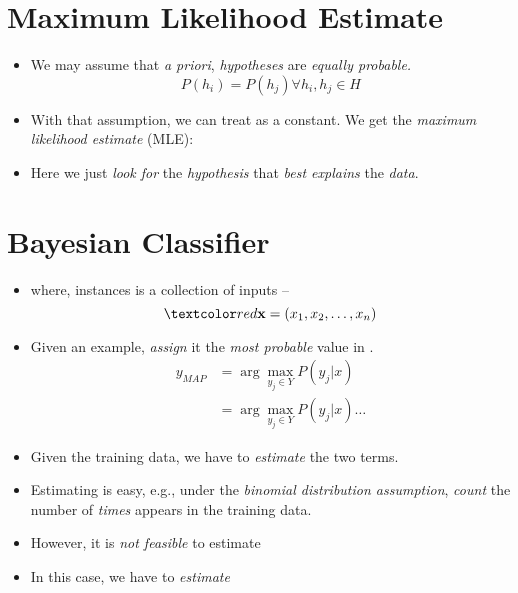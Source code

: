 \documentclass[
	number={3},
	title={Na\"{\i}ive Bayes Learning}
]{cs584notes}
\begin{document}
\section{Maximum Likelihood Estimate}\label{sec:maximum-likelihood-estimate}
\begin{itemize}
	\item We may assume that \emph{a priori}, \emph{hypotheses} are \emph{equally probable.}
	\[ P(h_{i}) = P(h_{j}) \forall h_{i}, h_{j} \in H \]
	\item With that assumption, we can treat  as a constant. We get the \emph{maximum likelihood estimate} (MLE):
	\item Here we just \emph{look for} the \emph{hypothesis} that \emph{best explains} the \emph{data}.
\end{itemize}

\section{Bayesian Classifier}\label{sec:bayesian-classifier}
\begin{itemize}
	\item {} where, instances  is a collection of inputs --
	\[ \data{ \vec{x} = (x_{1}, x_{2}, \dots, x_{n}) } \]
	\item Given an example, \emph{assign} it the \emph{most probable} value in .
	\begin{equation*}
	\begin{aligned}
		y_{MAP} &= \arg\max_{y_{j}\in Y} P(y_{j} | x)\\
				&= \arg\max_{y_{j}\in Y} P(y_{j} | x) \dots
	\end{aligned}
	\end{equation*}
	\item Given the training data, we have to \emph{estimate} the two terms.
	\item Estimating  is easy, e.g., under the \emph{binomial distribution assumption}, \emph{count} the number of \emph{times}  appears in the training data.
	\item However, it is \emph{not feasible} to estimate 
	\item In this case, we have to \emph{estimate}
\end{itemize}
\end{document}
